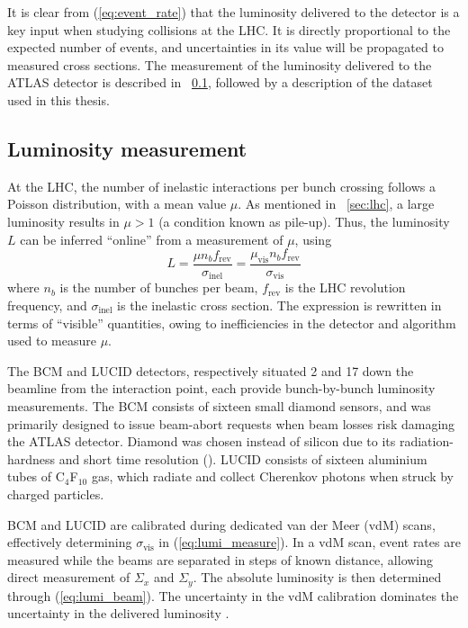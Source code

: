 
It is clear from (\ref{eq:event_rate}) that the luminosity delivered to the detector is a 
key input when studying \pp collisions at the \ac{LHC}. It is directly proportional to the 
expected number of events, and uncertainties in its value will be propagated to measured 
cross sections. The measurement of the luminosity delivered to the ATLAS detector is 
described in \Section~\ref{sec:dataset:lumi}, followed by a description of the dataset 
used in this thesis.



\subsection{Luminosity measurement}
\label{sec:dataset:lumi}

At the \ac{LHC}, the number of inelastic \pp interactions per bunch crossing follows a 
Poisson distribution, with a mean value $\mu$. As mentioned in \Section~\ref{sec:lhc}, 
a large luminosity results in $\mu > 1$ (a condition known as pile-up). Thus, the 
luminosity $L$ can be inferred ``online'' from a measurement of $\mu$, using
\begin{equation}
	L = \frac{\mu n_b f_{\text{rev}}}{\sigma_{\text{inel}}}
	= \frac{\mu_{\text{vis}} n_b f_{\text{rev}}}{\sigma_{\text{vis}}}
	\label{eq:lumi_measure}
\end{equation}
where $n_b$ is the number of bunches per beam, $f_{\text{rev}}$ is the \ac{LHC} revolution 
frequency, and $\sigma_{\text{inel}}$ is the inelastic \pp cross section. The 
expression is rewritten in terms of ``visible'' quantities, owing to inefficiencies in the
detector and algorithm used to measure $\mu$.

The \ac{BCM} and LUCID detectors, respectively situated \unit{2}{\metre} and 
\unit{17}{\metre} down the beamline from the interaction point, each provide 
bunch-by-bunch luminosity measurements. The \ac{BCM} consists of sixteen small diamond 
sensors, and was primarily designed to issue beam-abort requests when beam losses risk 
damaging the ATLAS detector. Diamond was chosen instead of silicon due to its 
radiation-hardness and short time resolution (\unit{}{\nano\second}).
LUCID consists of sixteen aluminium tubes of C$_4$F$_{10}$ gas, which radiate and collect 
Cherenkov photons when struck by charged particles.

\ac{BCM} and LUCID are calibrated during dedicated van der Meer (vdM) scans, effectively 
determining $\sigma_{\text{vis}}$ in (\ref{eq:lumi_measure}). In a vdM scan, event rates
are measured while the beams are separated in steps of known distance, allowing direct 
measurement of $\varSigma_x$ and $\varSigma_y$. The absolute luminosity is then determined 
through (\ref{eq:lumi_beam}). The uncertainty in the vdM calibration dominates the 
uncertainty in the delivered luminosity \cite{Lumi2011}.



